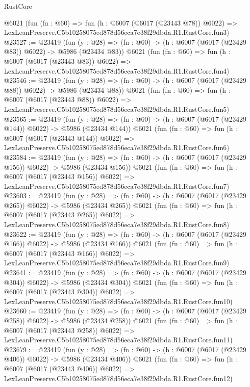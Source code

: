 \begin{lexlean}{RustCore}
\begin{coremodule}
    @6021
    (fun (fn : @60) =>
    fun (h : @6007 (@6017 (@23443 @78)) @6022) =>
    LexLeanPreserve.C5b10258075ed878d56eca7e38f29dbda.R1.RustCore.fun3)
@23527 := @23419
    (fun (y : @28) => (fn : @60) -> (h : @6007 (@6017 (@23429 @83)) @6022) -> @5986 (@23434 @83))
    @6021
    (fun (fn : @60) =>
    fun (h : @6007 (@6017 (@23443 @83)) @6022) =>
    LexLeanPreserve.C5b10258075ed878d56eca7e38f29dbda.R1.RustCore.fun4)
@23546 := @23419
    (fun (y : @28) => (fn : @60) -> (h : @6007 (@6017 (@23429 @88)) @6022) -> @5986 (@23434 @88))
    @6021
    (fun (fn : @60) =>
    fun (h : @6007 (@6017 (@23443 @88)) @6022) =>
    LexLeanPreserve.C5b10258075ed878d56eca7e38f29dbda.R1.RustCore.fun5)
@23565 := @23419
    (fun (y : @28) => (fn : @60) -> (h : @6007 (@6017 (@23429 @144)) @6022) -> @5986 (@23434 @144))
    @6021
    (fun (fn : @60) =>
    fun (h : @6007 (@6017 (@23443 @144)) @6022) =>
    LexLeanPreserve.C5b10258075ed878d56eca7e38f29dbda.R1.RustCore.fun6)
@23584 := @23419
    (fun (y : @28) => (fn : @60) -> (h : @6007 (@6017 (@23429 @156)) @6022) -> @5986 (@23434 @156))
    @6021
    (fun (fn : @60) =>
    fun (h : @6007 (@6017 (@23443 @156)) @6022) =>
    LexLeanPreserve.C5b10258075ed878d56eca7e38f29dbda.R1.RustCore.fun7)
@23603 := @23419
    (fun (y : @28) => (fn : @60) -> (h : @6007 (@6017 (@23429 @265)) @6022) -> @5986 (@23434 @265))
    @6021
    (fun (fn : @60) =>
    fun (h : @6007 (@6017 (@23443 @265)) @6022) =>
    LexLeanPreserve.C5b10258075ed878d56eca7e38f29dbda.R1.RustCore.fun8)
@23622 := @23419
    (fun (y : @28) => (fn : @60) -> (h : @6007 (@6017 (@23429 @166)) @6022) -> @5986 (@23434 @166))
    @6021
    (fun (fn : @60) =>
    fun (h : @6007 (@6017 (@23443 @166)) @6022) =>
    LexLeanPreserve.C5b10258075ed878d56eca7e38f29dbda.R1.RustCore.fun9)
@23641 := @23419
    (fun (y : @28) => (fn : @60) -> (h : @6007 (@6017 (@23429 @304)) @6022) -> @5986 (@23434 @304))
    @6021
    (fun (fn : @60) =>
    fun (h : @6007 (@6017 (@23443 @304)) @6022) =>
    LexLeanPreserve.C5b10258075ed878d56eca7e38f29dbda.R1.RustCore.fun10)
@23660 := @23419
    (fun (y : @28) => (fn : @60) -> (h : @6007 (@6017 (@23429 @258)) @6022) -> @5986 (@23434 @258))
    @6021
    (fun (fn : @60) =>
    fun (h : @6007 (@6017 (@23443 @258)) @6022) =>
    LexLeanPreserve.C5b10258075ed878d56eca7e38f29dbda.R1.RustCore.fun11)
@23679 := @23419
    (fun (y : @28) => (fn : @60) -> (h : @6007 (@6017 (@23429 @406)) @6022) -> @5986 (@23434 @406))
    @6021
    (fun (fn : @60) =>
    fun (h : @6007 (@6017 (@23443 @406)) @6022) =>
    LexLeanPreserve.C5b10258075ed878d56eca7e38f29dbda.R1.RustCore.fun12)

\end{coremodule}
\end{lexlean}

